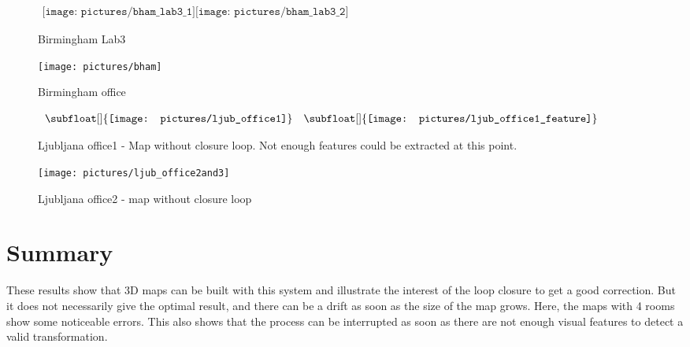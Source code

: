 \begin{figure}[H]
\centering$
 \begin{array}{c}
 \texttt{[image: pictures/bham\_lab3\_1]}
 \texttt{[image: pictures/bham\_lab3\_2]}
 \end{array}$
\caption{Birmingham Lab3}
\end{figure}


\begin{figure}[H]
\centering
\texttt{[image: pictures/bham]}
\caption{Birmingham office}
\end{figure}

\begin{figure}[H]
\centering$
 \begin{array}{cc}
 \subfloat[]{\label{fig:ljub1_1} \texttt{[image: pictures/ljub\_office1]}} &
 \subfloat[]{\label{fig:ljub1_2} \texttt{[image: pictures/ljub\_office1\_feature]}}
 \end{array}$
\caption{Ljubljana office1 - \protect{} Map without closure loop. \protect{} Not enough features could be extracted at this point.}
\end{figure}


\begin{figure}[H]
\centering
\texttt{[image: pictures/ljub\_office2and3]}
\caption{Ljubljana office2 - map without closure loop}
\end{figure}

\section{Summary}

These results show that 3D maps can be built with this system and illustrate the interest of the loop closure to get a good correction. But it does not necessarily  give the optimal result, and there can be a drift as soon as the size of the map grows. Here, the maps with 4 rooms show some noticeable errors. This also shows that the process can be interrupted as soon as there are not enough visual features to detect a valid transformation.

%
%



